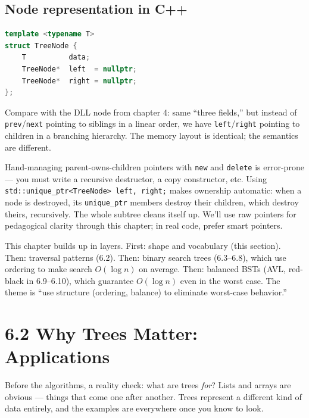\documentclass[11pt]{article}
\begin{document}
\subsection*{Node representation in C++}

\begin{examplebox}
\begin{lstlisting}[language=C++,basicstyle=\ttfamily\small,frame=single]
template <typename T>
struct TreeNode {
    T          data;
    TreeNode*  left  = nullptr;
    TreeNode*  right = nullptr;
};
\end{lstlisting}
\end{examplebox}

Compare with the DLL node from chapter 4: same ``three fields,''
but instead of \texttt{prev}/\texttt{next} pointing to siblings
in a linear order, we have \texttt{left}/\texttt{right} pointing
to children in a branching hierarchy. The memory layout is
identical; the semantics are different.

\begin{notebox}
Hand-managing parent-owns-children pointers with \texttt{new}
and \texttt{delete} is error-prone --- you must write a recursive
destructor, a copy constructor, etc. Using
\texttt{std::unique\_ptr<TreeNode> left, right;} makes ownership
automatic: when a node is destroyed, its \texttt{unique\_ptr}
members destroy their children, which destroy theirs,
recursively. The whole subtree cleans itself up. We'll use raw
pointers for pedagogical clarity through this chapter; in real
code, prefer smart pointers.
\end{notebox}

\begin{ideabox}
This chapter builds up in layers. First: shape and vocabulary
(this section). Then: traversal patterns (6.2). Then: binary
search trees (6.3--6.8), which use ordering to make search
$O(\log n)$ on average. Then: balanced BSTs (AVL, red-black in
6.9--6.10), which guarantee $O(\log n)$ even in the worst case.
The theme is ``use structure (ordering, balance) to eliminate
worst-case behavior.''
\end{ideabox}

\section{6.2 Why Trees Matter: Applications}

Before the algorithms, a reality check: what are trees \emph{for}?
Lists and arrays are obvious --- things that come one after
another. Trees represent a different kind of data entirely, and
the examples are everywhere once you know to look.
\end{document}
